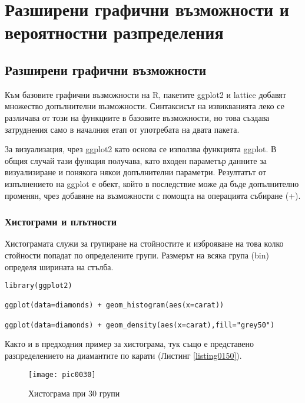 ﻿\newpage
\chapter{Разширени графични възможности и вероятностни разпределения}
\label{chapter08}

\section{Разширени графични възможности}

Към базовите графични възможности на R, пакетите ggplot2 и lattice добавят множество допълнителни възможности. Синтаксисът на извикванията леко се различава от този на функциите в базовите възможности, но това създава затруднения само в началния етап от употребата на двата пакета. 

За визуализация, чрез ggplot2 като основа се използва функцията ggplot. В общия случай тази функция получава, като входен параметър данните за визуализиране и понякога някои допълнителни параметри. Резултатът от изпълнението на ggplot е обект, който в последствие може да бъде допълнително променян, чрез добавяне на възможности с помощта на операцията събиране (+). 

\subsection{Хистограми и плътности}

Хистограмата служи за групиране на стойностите и изброяване на това колко стойности попадат по определените групи. Размерът на всяка група (bin) определя ширината на стълба. 

\begin{lstlisting}[caption=Хистограма и плътност, label=listing0150]
library(ggplot2)

ggplot(data=diamonds) + geom_histogram(aes(x=carat))

ggplot(data=diamonds) + geom_density(aes(x=carat),fill="grey50")
\end{lstlisting}

Както и в предходния пример за хистограма, тук също е представено разпределението на диамантите по карати (Листинг \ref{listing0150}).

\begin{figure}[h!]
  \centering
  \texttt{[image: pic0030]}
  \caption{Хистограма при 30 групи}
\label{figure0030}
\end{figure}
\FloatBarrier

